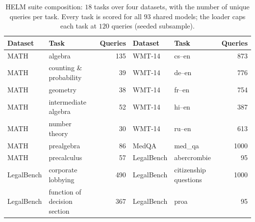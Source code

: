 \documentclass{article}
\theoremstyle{definition}
\theoremstyle{plain}
\begin{document}
\begin{table}[h]
\centering
\caption{HELM suite composition: $18$ tasks over four datasets, with the number of unique
queries per task. Every task is scored for all $93$ shared models; the loader caps each
task at $120$ queries (seeded subsample).}
\label{tab:helmsuite}
\footnotesize
\begin{tabular}{llr @{\hspace{2em}} llr}
\toprule
Dataset & Task & Queries & Dataset & Task & Queries \\
\midrule
MATH & algebra & 135 & WMT-14 & cs--en & 873 \\
MATH & counting \& probability & 39 & WMT-14 & de--en & 776 \\
MATH & geometry & 38 & WMT-14 & fr--en & 754 \\
MATH & intermediate algebra & 52 & WMT-14 & hi--en & 387 \\
MATH & number theory & 30 & WMT-14 & ru--en & 613 \\
MATH & prealgebra & 86 & MedQA & med\_qa & 1000 \\
MATH & precalculus & 57 & LegalBench & abercrombie & 95 \\
LegalBench & corporate lobbying & 490 & LegalBench & citizenship questions & 1000 \\
LegalBench & function of decision section & 367 & LegalBench & proa & 95 \\
\bottomrule
\end{tabular}
\end{table}
\end{document}
